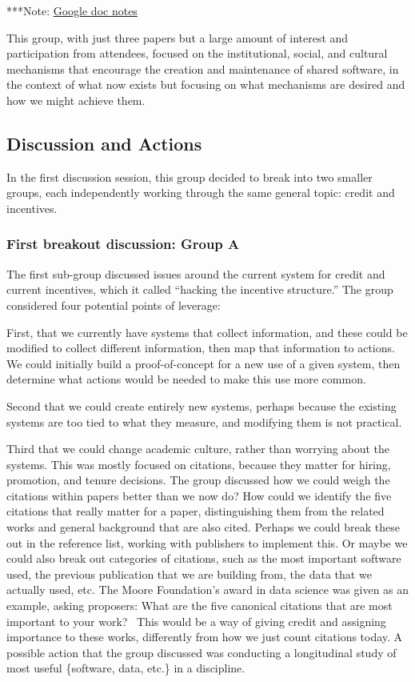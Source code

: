 \documentclass[11pt, oneside]{amsart}
\newcommand{\note}[1]{ {\textcolor{blueish}    { ***Note:      #1 }}}
\begin{document}
\note{\href{http://tinyurl.com/k8ruyn9}{Google doc notes}}

This group, with just three papers but a large amount of interest and
participation from attendees, focused on the institutional, social, and cultural
mechanisms that encourage the creation and maintenance of shared software, in the
context of what now exists but focusing on what mechanisms are desired and how
we might achieve them.


\subsection{Discussion and Actions}

In the first discussion session, this group decided to break into two smaller groups,
each independently working through the same general topic: credit and incentives.

\subsubsection{First breakout discussion: Group A}
The first sub-group discussed issues around the current system for credit and
current incentives, which it called ``hacking the incentive structure.'' The
group considered four potential points of leverage:

First, that we currently have systems that collect information, and these could
be modified to collect different information, then map that information to
actions. We could initially build a proof-of-concept for a new use of a given
system, then determine what actions would be needed to make this use more
common.

Second that we could create entirely new systems, perhaps because the existing
systems are too tied to what they measure, and modifying them is not practical.

Third that we could change academic culture, rather than worrying about the
systems. This was mostly focused on citations, because they matter for hiring,
promotion, and tenure decisions. The group discussed how we could weigh the
citations within papers better than we now do? How could we identify the five
citations that really matter for a paper, distinguishing them from the related
works and general background that are also cited. Perhaps we could break these
out in the reference list, working with publishers to implement this. Or maybe
we could also break out categories of citations, such as the most important
software used, the previous publication that we are building from, the data that
we actually used, etc. The Moore Foundation's award in data science was given as
an example, asking proposers: What are the five canonical citations that are
most important to your work?~\cite{moore-canonical} This would be a way of
giving credit and assigning importance to these works, differently from how we
just count citations today. A possible action that the group discussed was
conducting a longitudinal study of
most useful \{software, data, etc.\} in a discipline.
\end{document}
